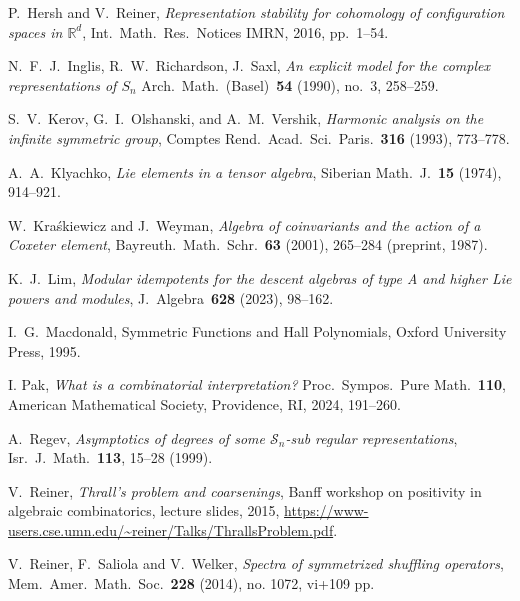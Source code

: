 \documentclass[12pt]%
{amsart}
\newcommand{\bbr}{\mathbb{R}}
\renewcommand\S{{\mathcal S}}
\def\red#1{{\color{red}{#1}}}
\theoremstyle{plain}
\theoremstyle{definition}
\theoremstyle{remark}
\begin{document}
\begin{thebibliography}{}
    P.\ Hersh and V.\ Reiner, 
    {\em Representation stability for cohomology of configuration spaces in $\bbr^d$}, 
    Int.\ Math.\ Res.\ Notices IMRN, 2016, pp.\ 1--54.

    N.\ F.\ J.\ Inglis, R.\ W.\ Richardson, J.\ Saxl, 
    {\em An explicit model for the complex representations of $S_n$} 
    Arch.\ Math.\ (Basel)~{\bf 54} (1990), no.~3, 258--259.

   S.\ V.\ Kerov, G.\ I.\ Olshanski, and A.\ M.\ Vershik,
   {\em Harmonic analysis on the infinite symmetric group},
   Comptes  Rend.\ Acad.\ Sci.\ Paris.~{\bf 316} (1993), 773--778.
   

    A.\ A.\ Klyachko, 
    {\em Lie elements in a tensor algebra}, 
    Siberian Math.\ J.~{\bf 15} (1974), 914--921.

    W.\ Kra\'skiewicz and J.\ Weyman, 
    {\em Algebra of coinvariants and the action of a Coxeter element}, 
    Bayreuth.\ Math.\ Schr.~{\bf 63} (2001), 265--284 (preprint, 1987).

    K.\ J.\ Lim, 
    {\em Modular idempotents for the descent algebras of type A and higher Lie powers and modules}, 
    J.\ Algebra~{\bf  628} (2023), 98--162.


    I.\ G.\ Macdonald,
    Symmetric Functions and Hall Polynomials, 
    Oxford University Press, 1995.

    I. Pak, 
    {\em What is a combinatorial interpretation?}
    Proc.\ Sympos.\ Pure Math.~{\bf 110}, 
    American Mathematical Society, Providence, RI, 2024, 191--260. 

    A.\ Regev, 
    {\em Asymptotics of degrees of some $\S_n$-sub regular representations}, 
    Isr.\ J.\ Math.~{\bf 113}, 15--28 (1999). 


    V.\ Reiner, 
    {\em Thrall's problem and coarsenings}, 
    Banff workshop on positivity in algebraic combinatorics,  
    lecture slides, 2015, \url{https://www-users.cse.umn.edu/~reiner/Talks/ThrallsProblem.pdf}. 

    V.\ Reiner, F.\ Saliola and V.\ Welker, 
    {\em Spectra of symmetrized shuffling operators}, 
    Mem.\ Amer.\ Math.\ Soc.~{\bf  228} (2014), no. 1072, vi+109 pp. 


\end{thebibliography}
\end{document}
